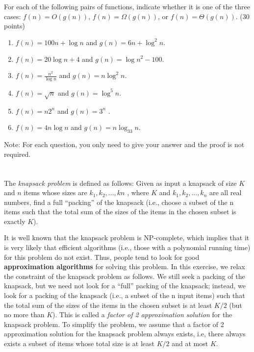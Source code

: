 \documentclass{article}
\begin{document}
\section{}
For each of the following pairs of functions, indicate whether it is
one of the three cases: $f (n) = O(g(n))$, $f (n) = \Omega(g(n))$, or
$f (n) = \Theta(g(n))$. (30 points)
\begin{enumerate}[label=(\alph*)]
\item $f (n) = 100n + \log n$ and $g(n) = 6n + \log^2 n$.
\item $f (n) = 20 \log n + 4$ and $g(n) = \log n^2 - 100$.
\item $f (n) =\frac{n^2}{\log n}$ and $g(n) = n \log^2 n$.
\item $f (n) =\sqrt{n}$ and $g(n) = \log^5 n$.
\item $f (n) = n2^n$ and $g(n) = 3^n$ .
\item $f (n) = 4n \log n$ and $g(n) = n \log_33 n$.
\end{enumerate}


Note: For each question, you only need to give your answer and the
proof is not required. 


\section{}
The \emph{knapsack problem} is defined as follows: Given as input a
knapsack of size $K$ and $n$ items whose sizes are $k_1 , k_2 ,
. . . , kn$ , where $K$ and $k_1 , k_2 , . . . , k_n$ are all real
numbers, find a full ``packing'' of the knapsack (i.e., choose a
subset of the n items such that the total sum of the sizes of the
items in the chosen subset is exactly $K$). 

It is well known that the knapsack problem is NP-complete, which
implies that it is very likely that efficient algorithms (i.e., those
with a polynomial running time) for this problem do not exist. Thus,
people tend to look for good {\bf approximation algorithms} for
solving this problem. In this exercise, we relax the constraint of the
knapsack problem as follows. We still seek a packing of the knapsack,
but we need not look for a ``full'' packing of the knapsack; instead,
we look for a packing of the knapsack (i.e., a subset of the n input
items) such that the total sum of the sizes of the items in the chosen
subset is at least $K/2$ (but no more than $K$). This is called a
\emph{factor of 2 approximation solution} for the knapsack problem. To 
simplify the problem, we assume that a factor of 2 approximation
solution for the knapsack problem always exists, i.e, there always
exists a subset of items whose total size is at least $K/2$ and at
most $K$. 
\end{document}
